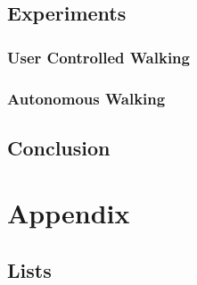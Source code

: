 \documentclass  [
  paper    = a4,
  BCOR     = 10mm,
  twoside,
  fontsize = 12pt,
  toc      = bibnumbered,
  toc      = listofnumbered,
  numbers  = noendperiod,
  headings = normal,
  listof   = leveldown,
  version  = 3.03
]                                       {scrreprt}
\begin{document}
  \chapter{Experiments}
  
  \section{User Controlled Walking}
  
  \section{Autonomous Walking}

  \chapter{Conclusion}

  \part{Appendix}
  \begin{appendix}
    \chapter{Lists}
    \listoffigures
    \listoftables
    
    
    
  \end{appendix}
\end{document}
